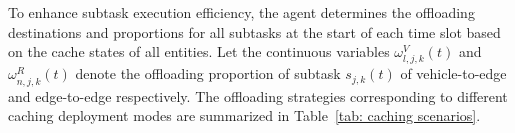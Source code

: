 \documentclass[lettersize,journal]{IEEEtran}
\begin{document}

To enhance subtask execution efficiency, the agent determines the offloading destinations and proportions for all subtasks at the start of each time slot based on the cache states of all entities.
Let the continuous variables $ \omega^{V}_{l,j,k}(t) $ and $ \omega^{R}_{n,j,k}(t) $ denote the offloading proportion of subtask $ s_{j,k}(t) $  of vehicle-to-edge and edge-to-edge respectively. 
The offloading strategies corresponding to different caching deployment modes are summarized in Table~\ref{tab: caching scenarios}.
\end{document}
